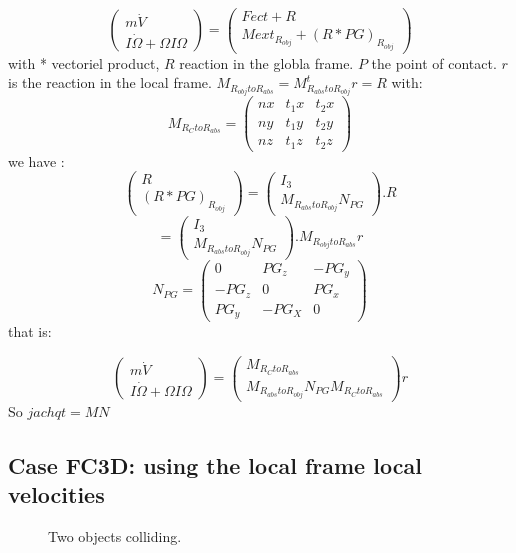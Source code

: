 \[\left(\begin{array}{c}m \dot V\\I \dot \Omega + \Omega I \Omega \end{array}\right)= \left(\begin{array}{c}Fect+R\\Mext _{R_{obj}} + (R*PG) _{R_{obj}} \end{array}\right)\]
  with * vectoriel product, $R$ reaction in the globla frame. $P$ the point of contact.
  $r$ is the reaction in the local frame.  $M_{R_{obj}toR_{abs}}=M_{R_{abs}toR_{obj}}^t r=R$ with:
  \[M_{R_{C}toR_{abs}}=\left(\begin{array}{ccc} nx&t_1x&t_2x \\ny&t_1y&t_2y\\nz&t_1z&t_2z \end{array}\right)\]
  we have :
  \[\left(\begin{array}{c}R\\(R*PG) _{R_{obj}}\end{array}\right)=\left(\begin{array}{c} I_3\\M_{R_{abs}toR_{obj}}N_{PG}\end{array}\right).R\]
  \[=\left(\begin{array}{c} I_3\\M_{R_{abs}toR_{obj}}N_{PG}\end{array}\right).M_{R_{obj}toR_{abs}}r\]
  \[ N_{PG}=\left(\begin{array}{ccc} 0&PG_z&-PG_y\\-PG_z&0&PG_x\\PG_y&-PG_X&0\end{array}\right)\]
    that is:
      
\[\left(\begin{array}{c}m \dot V\\I \dot \Omega + \Omega I \Omega \end{array}\right)=
\left(\begin{array}{c} M_{R_{C}toR_{abs}} \\
  M_{R_{abs}toR_{obj}}N_{PG}M_{R_{C}toR_{abs}}
\end{array}\right) r\]
So $jachqt=MN$

\subsection{Case FC3D: using the local frame local velocities}
\begin{figure}[h!]
  \centering
   \scalebox{0.6}{
  
  }
  \caption{Two objects colliding.}
  \label{figCase}
\end{figure}


